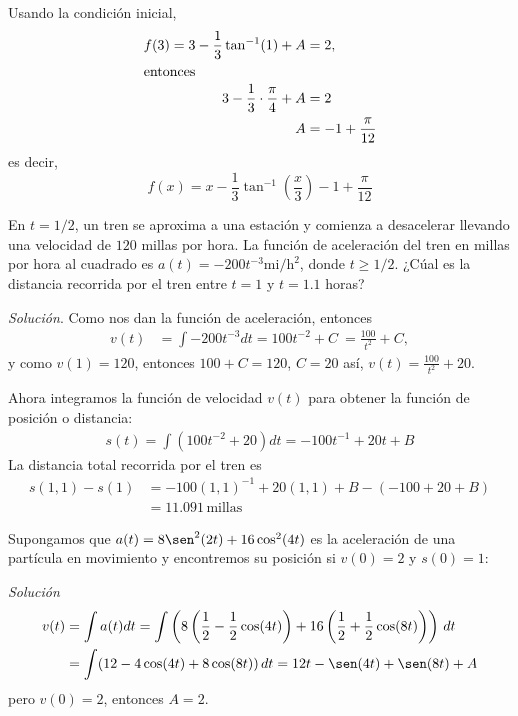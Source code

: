 Usando la condición inicial,
\begin{align*}
f(3)=3-\frac{1}{3}\tan^{-1}(1)+A&=2, \\
\intertext{entonces}
3-\frac{1}{3}\cdot\frac{\pi }{4}+A&=2\\
A&=-1+\frac{\pi }{12}
\end{align*}
es decir,
{\small
\[
f(x)=x-\frac{1}{3}\tan^{-1}\left(\frac{x}{3}\right)-1+\frac{\pi}{12} 
\]
}

\begin{ejemplo}
\textnormal{En \textit{$t=1/2$}, un tren se aproxima a una estación y comienza a desacelerar llevando una velocidad de \textit{$120$} millas por hora. La función de aceleración del tren en millas por hora al cuadrado es \textit{$a\left( t\right) =-200 t ^{-3}\text{mi}/\text{h}^{2}$}, donde \textit{$t\geq 1/2.$} ¿Cúal es la distancia recorrida por el tren entre \textit{$t=1$} y \textit{$t=1.1$} horas?}
\end{ejemplo}

\textit{Solución}. Como nos dan la función de aceleración, entonces
\begin{align*}
v\left( t\right) &=\int -200 t^{-3}dt%
=100t^{-2}+C \
=\frac{100}{t^{2}}+C,
\end{align*}
y como $v\left( 1\right) =120$, entonces $100+C=120$, $C=20$ así, $v\left( t\right)=\frac{100}{t ^{2}}+20$.

Ahora integramos la función de velocidad $v\left( t\right) $ para obtener la función de posición o distancia:
\begin{align*}
 s\left( t\right) =\int \left( 100t^{-2}+20\right)
dt=-100t^{-1}+20t+B
\end{align*}
La distancia total recorrida por el tren es
\begin{align*}
s\left( 1,1\right) -s\left( 1\right) &=-100\left( 1,1\right) ^{-1}+20\left(
1,1\right) +B-\left( -100+20+B\right) \\
&=11.091\, \text{millas}
\end{align*}

\begin{ejemplo}
\textnormal{Supongamos que \textit{$a(t)=8\sen ^{2}(2t)+16\cos ^{2}(4t)$} es la aceleración de una partícula en movimiento y encontremos su posición si \textit{$v(0)=2$} y \textit{$s(0)=1$}:}
\end{ejemplo}

\textit{Solución}
\begin{align*}
v(t)&=\int a(t)dt=\int \left( 8\left(\frac{1}{2}-\frac{1}{2}\cos(4t)\right)+16\left(\frac{1}{2}+%
\frac{1}{2}\cos (8t)\right) \right) \,dt\\
&=\int (12-4\cos (4t)+8\cos (8t))\,dt=12t-\sen (4t)+\sen (8t)+A
\end{align*}
pero $v(0)=2$, entonces $A=2$.

